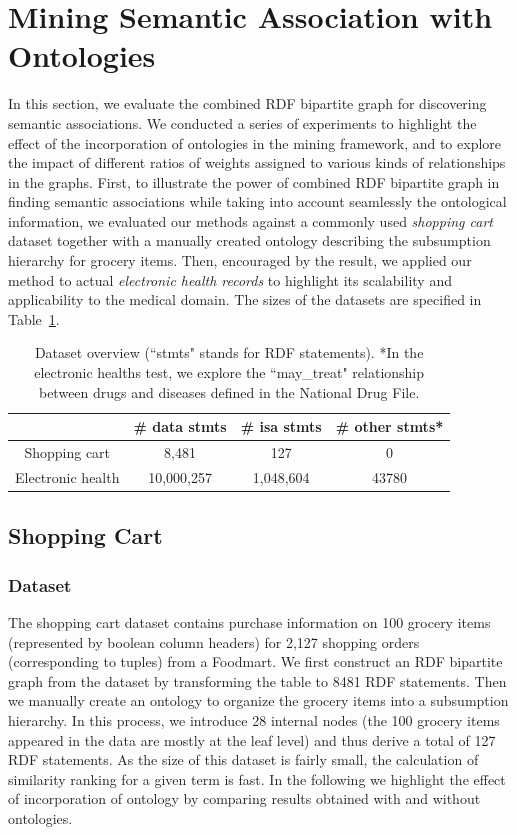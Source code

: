 \section{Mining Semantic Association with Ontologies}
In this section, we evaluate the combined RDF bipartite graph for discovering semantic associations. We conducted a series of experiments to highlight the effect of the incorporation of ontologies in the mining framework, and to explore the impact of different ratios of weights assigned to various kinds of relationships in the graphs. First, to illustrate the power of combined RDF bipartite graph in finding semantic associations while taking into account seamlessly the ontological information, we evaluated our methods against a commonly used \emph{shopping cart} dataset together with a manually created ontology describing the subsumption hierarchy for grocery items.  Then, encouraged by the result, we applied our method to actual \emph{electronic health records} to highlight its scalability and applicability to the medical domain. The sizes of the datasets are specified in Table~\ref{tbl:exp_overview}.

\begin{table}[tbh]\scriptsize
\begin{center}
\begin{tabular}{c|c|c|c}
\hline
    & \# data stmts & \# isa stmts & \# other stmts* \\
    \hline
  Shopping cart     &  8,481       & 127       &    0\\
  Electronic health &  10,000,257  & 1,048,604 &    43780\\
  \hline
\end{tabular}
\end{center}
\caption{\label{tbl:exp_overview} Dataset overview (``stmts" stands for RDF statements). *In the electronic healths test, we explore the ``may\_treat" relationship between drugs and diseases defined in the National Drug File.}
\end{table}


\subsection{Shopping Cart}
\subsubsection{Dataset}
The shopping cart dataset contains purchase information on 100 grocery items (represented by boolean column headers) for 2,127 shopping orders (corresponding to tuples) from a Foodmart. We first construct an RDF bipartite graph from the dataset by transforming the table to 8481 RDF statements. Then we manually create an ontology to organize the grocery items into a subsumption hierarchy. In this process, we introduce 28 internal nodes (the 100 grocery items appeared in the data are mostly at the leaf level) and thus derive a total of 127 RDF statements. As the size of this dataset is fairly small, the calculation of similarity ranking for a given term is fast. In the following we highlight the effect of incorporation of ontology by comparing results obtained with and without ontologies.


